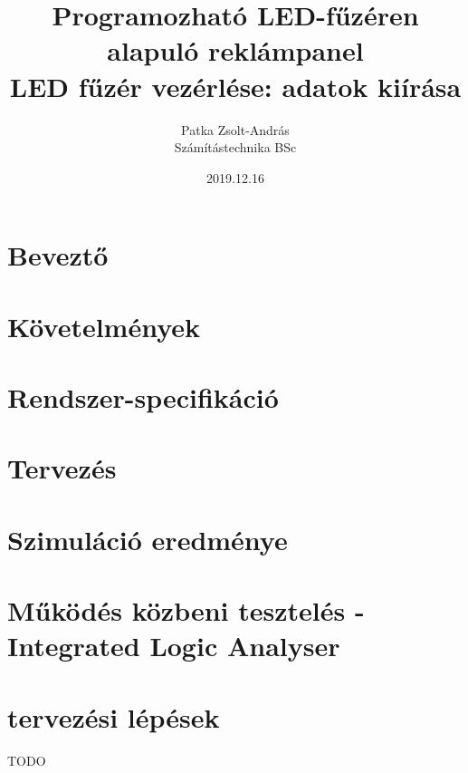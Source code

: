 \documentclass[12pt]{article}
\title{Programozható LED-fűzéren alapuló reklámpanel \\
	LED fűzér vezérlése: adatok kiírása}
\author{Patka Zsolt-András \\ Számítástechnika BSc}
\date{2019.12.16}
\begin{document}
\maketitle
{}

\newpage
\tableofcontents
\newpage

\section{Beveztő}


\section{Követelmények}


\section{Rendszer-specifikáció}


\section{Tervezés}


\section{Szimuláció eredménye}


\section{Működés közbeni tesztelés - Integrated Logic Analyser}





\appendix
\section{tervezési lépések}

TODO
\end{document}
